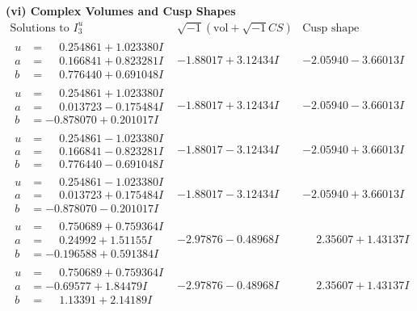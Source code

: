 \documentclass[1p]{elsarticle_modified}
\theoremstyle{definition}
\newcommand{\I}{\sqrt{-1}}
\begin{document}
\newpage\flushleft \textbf{(vi) Complex Volumes and Cusp Shapes}
$$\begin{array}{c|c|c}  
\text{Solutions to }I^u_{3}& \I (\text{vol} + \sqrt{-1}CS) & \text{Cusp shape}\\
 \hline 
\begin{aligned}
u &= \phantom{-}0.254861 + 1.023380 I \\
a &= \phantom{-}0.166841 + 0.823281 I \\
b &= \phantom{-}0.776440 + 0.691048 I\end{aligned}
 & -1.88017 + 3.12434 I & -2.05940 - 3.66013 I \\ \hline\begin{aligned}
u &= \phantom{-}0.254861 + 1.023380 I \\
a &= \phantom{-}0.013723 - 0.175484 I \\
b &= -0.878070 + 0.201017 I\end{aligned}
 & -1.88017 + 3.12434 I & -2.05940 - 3.66013 I \\ \hline\begin{aligned}
u &= \phantom{-}0.254861 - 1.023380 I \\
a &= \phantom{-}0.166841 - 0.823281 I \\
b &= \phantom{-}0.776440 - 0.691048 I\end{aligned}
 & -1.88017 - 3.12434 I & -2.05940 + 3.66013 I \\ \hline\begin{aligned}
u &= \phantom{-}0.254861 - 1.023380 I \\
a &= \phantom{-}0.013723 + 0.175484 I \\
b &= -0.878070 - 0.201017 I\end{aligned}
 & -1.88017 - 3.12434 I & -2.05940 + 3.66013 I \\ \hline\begin{aligned}
u &= \phantom{-}0.750689 + 0.759364 I \\
a &= \phantom{-}0.24992 + 1.51155 I \\
b &= -0.196588 + 0.591384 I\end{aligned}
 & -2.97876 - 0.48968 I & \phantom{-}2.35607 + 1.43137 I \\ \hline\begin{aligned}
u &= \phantom{-}0.750689 + 0.759364 I \\
a &= -0.69577 + 1.84479 I \\
b &= \phantom{-}1.13391 + 2.14189 I\end{aligned}
 & -2.97876 - 0.48968 I & \phantom{-}2.35607 + 1.43137 I \\ \hline\begin{aligned}

\end{aligned}
\end{array}$$
\end{document}
